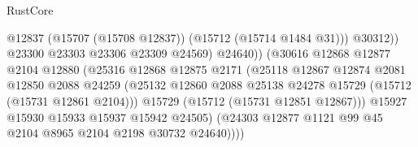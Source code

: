 \begin{lexlean}{RustCore}
\begin{coremodule}
                                                @12837
                                                (@15707 (@15708 @12837))
                                                (@15712 (@15714 @1484 @31)))
                                              @30312))
                                          @23300
                                          @23303
                                          @23306
                                          @23309
                                          @24569)
                                        @24640))
                                    (@30616
                                      @12868
                                      @12877
                                      @2104
                                      @12880
                                      (@25316
                                        @12868
                                        @12875
                                        @2171
                                        (@25118
                                          @12867
                                          @12874
                                          @2081
                                          @12850
                                          @2088
                                          @24259
                                          (@25132
                                            @12860
                                            @2088
                                            @25138
                                            @24278
                                            @15729
                                            (@15712 (@15731 @12861 @2104)))
                                          @15729
                                          (@15712 (@15731 @12851 @12867)))
                                        @15927
                                        @15930
                                        @15933
                                        @15937
                                        @15942
                                        @24505)
                                      (@24303
                                        @12877
                                        @1121
                                        @99
                                        @45
                                        @2104
                                        @8965
                                        @2104
                                        @2198
                                        @30732
                                        @24640))))

\end{coremodule}
\end{lexlean}

